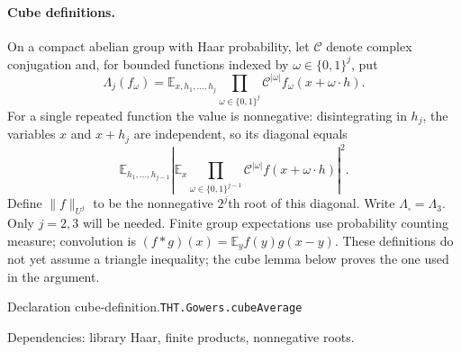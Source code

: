 \documentclass[11pt]{article}
\theoremstyle{definition}
\newcommand{\E}{\mathbb E}
\numberwithin{equation}{section}
\newcommand{\bp}[3]{\par\smallskip\begingroup\footnotesize
\noindent\hypertarget{bp:#1}{\textsf{Declaration #1.}}\quad\nolinkurl{#2}\par
\noindent\textsf{Dependencies:} #3.\par\endgroup\smallskip}
\begin{document}
\paragraph{Cube definitions.}
On a compact abelian group with Haar probability, let $\mathcal C$ denote complex conjugation and, for bounded functions indexed by $\omega\in\{0,1\}^j$, put
\[
 \Lambda_j(f_\omega)=\E_{x,h_1,\ldots,h_j}
 \prod_{\omega\in\{0,1\}^j}\mathcal C^{|\omega|}f_\omega(x+\omega\cdot h).
\]
For a single repeated function the value is nonnegative: disintegrating in $h_j$, the variables $x$ and $x+h_j$ are independent, so its diagonal equals
\[
 \E_{h_1,\ldots,h_{j-1}}
 \left|\E_x\prod_{\omega\in\{0,1\}^{j-1}}
 \mathcal C^{|\omega|}f(x+\omega\cdot h)\right|^2.
\]
Define $\|f\|_{U^j}$ to be the nonnegative $2^j$th root of this diagonal. Write $\Lambda_\square=\Lambda_3$. Only $j=2,3$ will be needed. Finite group expectations use probability counting measure; convolution is $(f*g)(x)=\E_y f(y)g(x-y)$. These definitions do not yet assume a triangle inequality; the cube lemma below proves the one used in the argument.
\bp{cube-definition}{THT.Gowers.cubeAverage}{library Haar, finite products, nonnegative roots}
\end{document}
